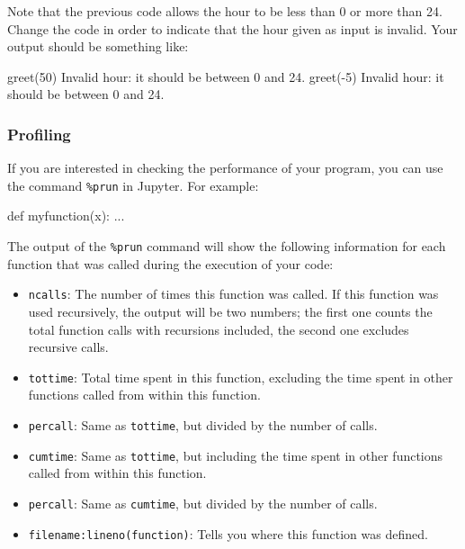\begin{exercise}
Note that the previous code allows the hour to be less than 0 or more than 24.  Change the code in order to indicate that the hour given as input is invalid.  Your output should be something like:

\begin{python}
greet(50)
Invalid hour: it should be between 0 and 24.
greet(-5)
Invalid hour: it should be between 0 and 24.
\end{python}

\end{exercise}

\subsubsection{Profiling}

If you are interested in checking the performance of your program, you can use the command \texttt{\%prun} in Jupyter. For example:

\begin{python}
def myfunction(x):
    ...

\end{python}

The output of the \texttt{\%prun} command will show the following information
for each function that was called during the execution of your code:

\begin{itemize}
\item \texttt{ncalls}: The number of times this function was called. If this function was used recursively, the output will be two numbers; the first one counts the total function calls with recursions included, the second one excludes recursive calls.
\item \texttt{tottime}: Total time spent in this function, excluding the time spent in other functions called from within this function.
\item \texttt{percall}: Same as \texttt{tottime}, but divided by the number of calls.
\item \texttt{cumtime}: Same as \texttt{tottime}, but including the time spent in other functions called from within this function.
\item \texttt{percall}: Same as \texttt{cumtime}, but divided by the number of calls.
\item \texttt{filename:lineno(function)}: Tells you where this function was defined.
\end{itemize}

